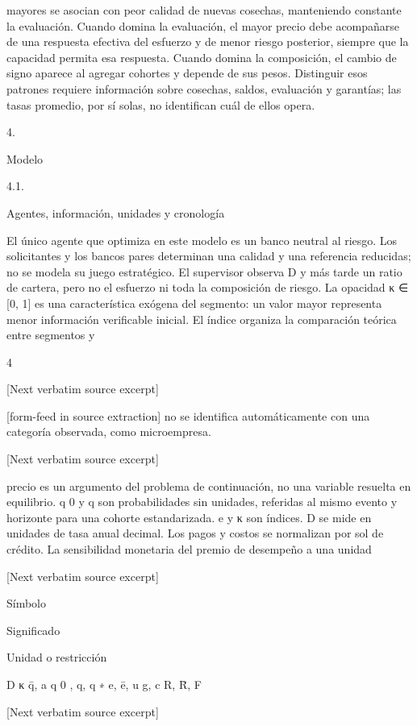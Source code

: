 \documentclass[10pt]{article}
\begin{document}
\begin{ReviewVerbatim}

mayores se asocian con peor calidad de nuevas cosechas, manteniendo constante la evaluación.
Cuando domina la evaluación, el mayor precio debe acompañarse de una respuesta efectiva del
esfuerzo y de menor riesgo posterior, siempre que la capacidad permita esa respuesta. Cuando
domina la composición, el cambio de signo aparece al agregar cohortes y depende de sus pesos.
Distinguir esos patrones requiere información sobre cosechas, saldos, evaluación y garantías; las
tasas promedio, por sí solas, no identiﬁcan cuál de ellos opera.

4.

Modelo

4.1.

Agentes, información, unidades y cronología

El único agente que optimiza en este modelo es un banco neutral al riesgo. Los solicitantes y los
bancos pares determinan una calidad y una referencia reducidas; no se modela su juego estratégico.
El supervisor observa D y más tarde un ratio de cartera, pero no el esfuerzo ni toda la composición de
riesgo. La opacidad κ ∈ [0, 1] es una característica exógena del segmento: un valor mayor representa
menor información veriﬁcable inicial. El índice organiza la comparación teórica entre segmentos y

4

[Next verbatim source excerpt]



[form-feed in source extraction]
no se identiﬁca automáticamente con una categoría observada, como microempresa.

[Next verbatim source excerpt]

precio es un argumento del problema de continuación, no una variable resuelta en equilibrio.
q 0 y q son probabilidades sin unidades, referidas al mismo evento y horizonte para una cohorte
estandarizada. e y κ son índices. D se mide en unidades de tasa anual decimal. Los pagos y costos
se normalizan por sol de crédito. La sensibilidad monetaria del premio de desempeño a una unidad

[Next verbatim source excerpt]

Símbolo

Signiﬁcado

Unidad o restricción

D
κ
q̄, a
q 0 , q, q ∗
e, ē, u
g, c
R, R̄, F


[Next verbatim source excerpt]



\end{ReviewVerbatim}
\end{document}

